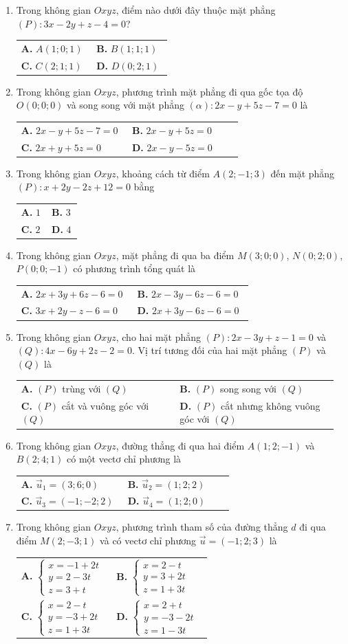 \documentclass[12pt,a4paper]{article}
\makeatletter
\newcommand{\bonpa}[4]{\par\nobreak\smallskip\nobreak\noindent
\begin{tabular}{@{}p{0.48\linewidth}p{0.48\linewidth}@{}}
\textbf{A.} #1 & \textbf{B.} #2\\[8pt]
\textbf{C.} #3 & \textbf{D.} #4\end{tabular}}
\makeatother
\begin{document}
\begin{enumerate}
\item Trong không gian $Oxyz$, điểm nào dưới đây thuộc mặt phẳng $(P): 3x - 2y + z - 4 = 0$?
\bonpa{$A(1; 0; 1)$}{$B(1; 1; 1)$}{$C(2; 1; 1)$}{$D(0; 2; 1)$}

\item Trong không gian $Oxyz$, phương trình mặt phẳng đi qua gốc tọa độ $O(0; 0; 0)$ và song song với mặt phẳng $(\alpha): 2x - y + 5z - 7 = 0$ là
\bonpa{$2x - y + 5z - 7 = 0$}{$2x - y + 5z = 0$}{$2x + y + 5z = 0$}{$2x - y - 5z = 0$}

\item Trong không gian $Oxyz$, khoảng cách từ điểm $A(2; -1; 3)$ đến mặt phẳng $(P): x + 2y - 2z + 12 = 0$ bằng
\bonpa{$1$}{$3$}{$2$}{$4$}

\item Trong không gian $Oxyz$, mặt phẳng đi qua ba điểm $M(3; 0; 0)$, $N(0; 2; 0)$, $P(0; 0; -1)$ có phương trình tổng quát là
\bonpa{$2x + 3y + 6z - 6 = 0$}{$2x - 3y - 6z - 6 = 0$}{$3x + 2y - z - 6 = 0$}{$2x + 3y - 6z - 6 = 0$}

\item Trong không gian $Oxyz$, cho hai mặt phẳng $(P): 2x - 3y + z - 1 = 0$ và $(Q): 4x - 6y + 2z - 2 = 0$. Vị trí tương đối của hai mặt phẳng $(P)$ và $(Q)$ là
\bonpa{$(P)$ trùng với $(Q)$}{$(P)$ song song với $(Q)$}{$(P)$ cắt và vuông góc với $(Q)$}{$(P)$ cắt nhưng không vuông góc với $(Q)$}

\item Trong không gian $Oxyz$, đường thẳng đi qua hai điểm $A(1; 2; -1)$ và $B(2; 4; 1)$ có một vectơ chỉ phương là
\bonpa{$\vec{u}_1 = (3; 6; 0)$}{$\vec{u}_2 = (1; 2; 2)$}{$\vec{u}_3 = (-1; -2; 2)$}{$\vec{u}_4 = (1; 2; 0)$}

\item Trong không gian $Oxyz$, phương trình tham số của đường thẳng $d$ đi qua điểm $M(2; -3; 1)$ và có vectơ chỉ phương $\vec{u} = (-1; 2; 3)$ là
\bonpa{$\begin{cases} x = -1 + 2t \\ y = 2 - 3t \\ z = 3 + t \end{cases}$}{$\begin{cases} x = 2 - t \\ y = 3 + 2t \\ z = 1 + 3t \end{cases}$}{$\begin{cases} x = 2 - t \\ y = -3 + 2t \\ z = 1 + 3t \end{cases}$}{$\begin{cases} x = 2 + t \\ y = -3 - 2t \\ z = 1 - 3t \end{cases}$}


\end{enumerate}
\end{document}
